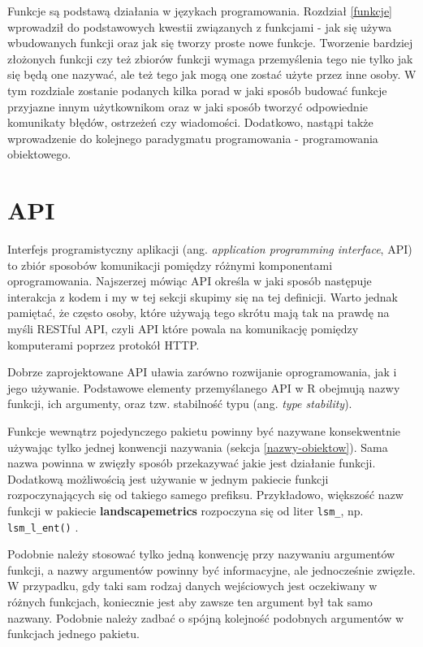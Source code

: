 \documentclass[paper=6in:9in,pagesize=pdftex,headinclude=on,footinclude=on,10pt]{scrbook}
\begin{document}
Funkcje są podstawą działania w językach programowania.
Rozdział \ref{funkcje} wprowadził do podstawowych kwestii związanych z funkcjami - jak się używa wbudowanych funkcji oraz jak się tworzy proste nowe funkcje.
Tworzenie bardziej złożonych funkcji czy też zbiorów funkcji wymaga przemyślenia tego nie tylko jak się będą one nazywać, ale też tego jak mogą one zostać użyte przez inne osoby.
W tym rozdziale zostanie podanych kilka porad w jaki sposób budować funkcje przyjazne innym użytkownikom oraz w jaki sposób tworzyć odpowiednie komunikaty błędów, ostrzeżeń czy wiadomości.
Dodatkowo, nastąpi także wprowadzenie do kolejnego paradygmatu programowania - programowania obiektowego.

\hypertarget{api}{%
\section{API}\label{api}}

Interfejs programistyczny aplikacji (ang. \emph{application programming interface}, API) to zbiór sposobów komunikacji pomiędzy różnymi komponentami oprogramowania.
Najszerzej mówiąc API określa w jaki sposób następuje interakcja z kodem i my w tej sekcji skupimy się na tej definicji.
Warto jednak pamiętać, że często osoby, które używają tego skrótu mają tak na prawdę na myśli RESTful API, czyli API które powala na komunikację pomiędzy komputerami poprzez protokół HTTP.

Dobrze zaprojektowane API uławia zarówno rozwijanie oprogramowania, jak i jego używanie.
Podstawowe elementy przemyślanego API w R obejmują nazwy funkcji, ich argumenty, oraz tzw. stabilność typu (ang. \emph{type stability}).

Funkcje wewnątrz pojedynczego pakietu powinny być nazywane konsekwentnie używając tylko jednej konwencji nazywania (sekcja \ref{nazwy-obiektow}).
Sama nazwa powinna w zwięzły sposób przekazywać jakie jest działanie funkcji.
Dodatkową możliwością jest używanie w jednym pakiecie funkcji rozpoczynających się od takiego samego prefiksu.
Przykładowo, większość nazw funkcji w pakiecie \textbf{landscapemetrics} rozpoczyna się od liter \texttt{lsm\_}, np. \texttt{lsm\_l\_ent()} \citep{R-landscapemetrics}.

Podobnie należy stosować tylko jedną konwencję przy nazywaniu argumentów funkcji, a nazwy argumentów powinny być informacyjne, ale jednocześnie zwięzłe.
W przypadku, gdy taki sam rodzaj danych wejściowych jest oczekiwany w różnych funkcjach, koniecznie jest aby zawsze ten argument był tak samo nazwany.
Podobnie należy zadbać o spójną kolejność podobnych argumentów w funkcjach jednego pakietu.
\end{document}
